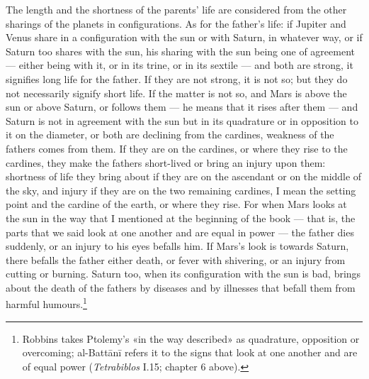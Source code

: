 \documentclass[11pt]{article}
\newcommand{\Fol}[1]{\marginpar{\footnotesize\color{gray}f.\,#1}}
\begin{document}
\par \Fol{37v}The length and the shortness of the parents' life are considered from the other sharings of the planets in configurations. As for the father's life: if Jupiter and Venus share in a configuration with the sun or with Saturn, in whatever way, or if Saturn too shares with the sun, his sharing with the sun being one of agreement — either being with it, or in its trine, or in its sextile — and both are strong, it signifies long life for the father. If they are not strong, it is not so; but they do not necessarily signify short life. If the matter is not so, and Mars is above the sun or above Saturn, or follows them — he means that it rises after them — and Saturn is not in agreement with the sun but in its quadrature or in opposition to it on the diameter, or both are declining from the cardines, weakness of the fathers comes from them. If they are on the cardines, or where they rise to the cardines, they make the fathers short-lived or bring an injury upon them: shortness of life they bring about if they are on the ascendant or on the middle of the sky, and injury if they are on the two remaining cardines, I mean the setting point and the cardine of the earth, or where they rise. For when Mars looks at the sun in the way that I mentioned at the beginning of the book — that is, the parts that we said look at one another and are equal in power — the father dies suddenly, or an injury to his eyes befalls him. If Mars's look is towards Saturn, there befalls the father either death, or fever with shivering, or an injury from cutting or burning. Saturn too, when its configuration with the sun is bad, brings about the death of the fathers by diseases and by illnesses that befall them from harmful humours.\footnote{Robbins takes Ptolemy's «in the way described» as quadrature, opposition or overcoming; al-Battānī refers it to the signs that look at one another and are of equal power (\emph{Tetrabiblos} I.15; chapter 6 above).}\par
\end{document}
